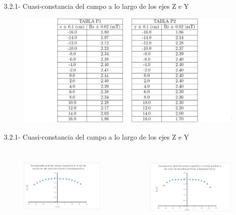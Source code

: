 \documentclass{beamer}
\begin{document}
\begin{frame}{3.2.1- Cuasi-constancia del campo a lo largo de los ejes Z e Y}
 \begin{figure}
  \includegraphics[scale=0.4]{TablaPuta.JPG}
  \end{figure}
\end{frame}
\begin{frame}{3.2.1- Cuasi-constancia del campo a lo largo de los ejes Z e Y}
    \begin{columns}
         \begin{figure}
            \includegraphics[scale=0.4]{image0.png}
            \label{fig:my_label}
        \end{figure}
         \begin{figure}
            \includegraphics[scale=0.4]{image1.png}
            \label{fig:my_label}
        \end{figure}
    \end{columns}
\end{frame}
\end{document}
